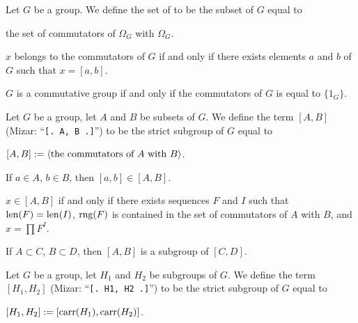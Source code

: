 \documentclass{article}
\begin{document}
\begin{definition}
Let $G$ be a group. We define the set of 
to be the subset of $G$ equal to
\begin{defn}
\item the set of commutators of $\Omega_{G}$ with $\Omega_{G}$.
\end{defn}
\end{definition}

\begin{thm}
\item\label{group5:58} $x$ belongs to the commutators of $G$ if and only
  if there exists elements $a$ and $b$ of $G$ such that $x=[a,b]$.
\item\label{group5:59} $G$ is a commutative group if and only if the
  commutators of $G$ is equal to $\{1_{G}\}$.
\end{thm}

\begin{definition}
Let $G$ be a group, let $A$ and $B$ be subsets of $G$.
We define the term $[A,B]$ (Mizar: ``\verb#[. A, B .]#'') to be the
strict subgroup of $G$ equal to
\begin{defn}
\item $[A,B]:=\langle\mbox{the commutators of $A$ with $B$}\rangle$.
\end{defn}
\end{definition}


\begin{thm}
\item\label{group5:60} If $a\in A$, $b\in B$, then $[a,b]\in[A,B]$.
\item\label{group5:61} $x\in[A,B]$ if and only if there exists sequences
  $F$ and $I$ such that $\operatorname{len}(F)=\operatorname{len}(I)$, $\operatorname{rng}(F)$ is contained in the
  set of commutators of $A$ with $B$, and $x=\prod F^{I}$.
\item\label{group5:62} If $A\subset C$, $B\subset D$, then $[A,B]$ is a
  subgroup of $[C,D]$.
\end{thm}

\begin{definition}
Let $G$ be a group, let $H_{1}$ and $H_{2}$ be subgroups of $G$.
We define the term $[H_{1},H_{2}]$ (Mizar: ``\verb#[. H1, H2 .]#'')
to be the strict subgroup of $G$ equal to
\begin{defn}
\item $[H_{1},H_{2}]:=[\operatorname{carr}(H_{1}),\operatorname{carr}(H_{2})]$.
\end{defn}
\end{definition}
\end{document}

